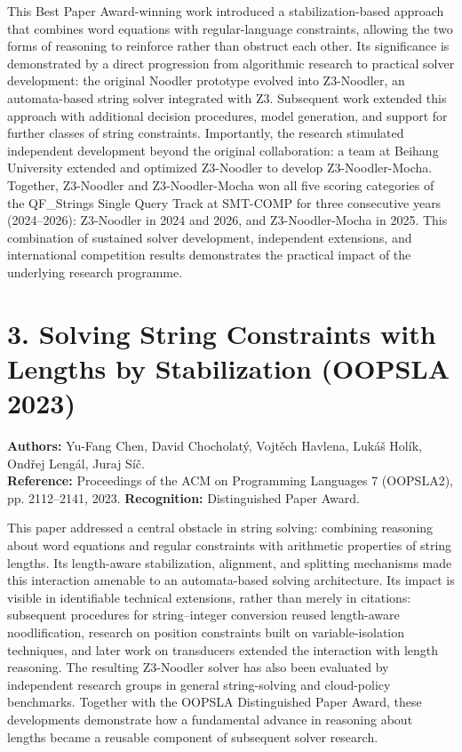 \documentclass[10pt,a4paper]{article}
\begin{document}
This Best Paper Award-winning work introduced a stabilization-based approach that combines word equations with regular-language constraints, allowing the two forms of reasoning to reinforce rather than obstruct each other. Its significance is demonstrated by a direct progression from algorithmic research to practical solver development: the original Noodler prototype evolved into Z3-Noodler, an automata-based string solver integrated with Z3. Subsequent work extended this approach with additional decision procedures, model generation, and support for further classes of string constraints. Importantly, the research stimulated independent development beyond the original collaboration: a team at Beihang University extended and optimized Z3-Noodler to develop Z3-Noodler-Mocha. Together, Z3-Noodler and Z3-Noodler-Mocha won all five scoring categories of the QF\_Strings Single Query Track at SMT-COMP for three consecutive years (2024--2026): Z3-Noodler in 2024 and 2026, and Z3-Noodler-Mocha in 2025. This combination of sustained solver development, independent extensions, and international competition results demonstrates the practical impact of the underlying research programme.

\section{3. Solving String Constraints with Lengths by Stabilization (OOPSLA 2023)}
\textbf{Authors:} Yu-Fang Chen, David Chocholatý, Vojtěch Havlena, Lukáš Holík, Ondřej Lengál, Juraj Síč.\\
\textbf{Reference:} Proceedings of the ACM on Programming Languages 7 (OOPSLA2), pp. 2112--2141, 2023. \textbf{Recognition:} Distinguished Paper Award.

This paper addressed a central obstacle in string solving: combining reasoning about word equations and regular constraints with arithmetic properties of string lengths. Its length-aware stabilization, alignment, and splitting mechanisms made this interaction amenable to an automata-based solving architecture. Its impact is visible in identifiable technical extensions, rather than merely in citations: subsequent procedures for string--integer conversion reused length-aware noodlification, research on position constraints built on variable-isolation techniques, and later work on transducers extended the interaction with length reasoning. The resulting Z3-Noodler solver has also been evaluated by independent research groups in general string-solving and cloud-policy benchmarks. Together with the OOPSLA Distinguished Paper Award, these developments demonstrate how a fundamental advance in reasoning about lengths became a reusable component of subsequent solver research.
\end{document}
